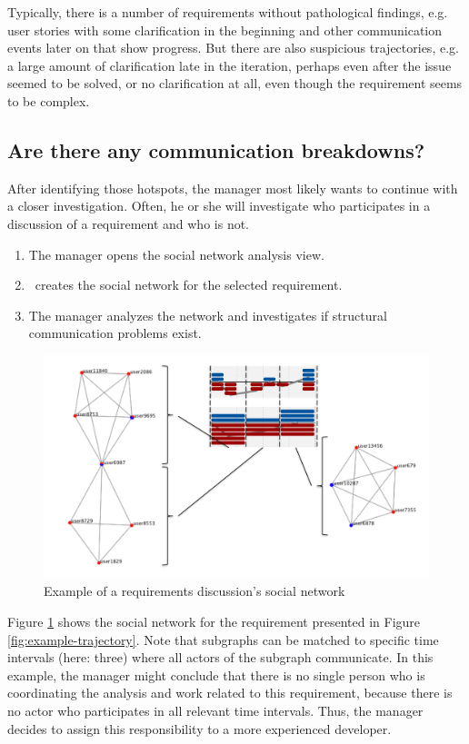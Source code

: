 Typically, there is a number of requirements without pathological findings, e.g. user stories with some clarification in the beginning and other communication events later on that show progress. 
But there are also suspicious trajectories, e.g. a large amount of clarification late in the iteration, perhaps even after the issue seemed to be solved, or no clarification at all, even though the requirement seems to be complex.

\subsection{Are there any communication breakdowns?}
After identifying those hotspots, the manager most likely wants to continue with a closer investigation. 
Often, he or she will investigate who participates in a discussion of a requirement and who is not.
\begin{enumerate}
\item The manager opens the social network analysis view.
\item \viss\ creates the social network for the selected requirement.
\item The manager analyzes the network and investigates if structural communication problems exist.
\end{enumerate}

\begin{figure}
\includegraphics[width=\columnwidth]{img/example-sn}
\caption{Example of a requirements discussion's social network}
\label{fig:example-sn}
\end{figure}

Figure \ref{fig:example-sn} shows the social network for the requirement presented in Figure \ref{fig:example-trajectory}. 
Note that subgraphs can be matched to specific time intervals (here: three) where all actors of the subgraph communicate. 
In this example, the manager might conclude that there is no single person who is coordinating the analysis and work related to this requirement, because there is no actor who participates in all relevant time intervals.
Thus, the manager decides to assign this responsibility to a more experienced developer.

